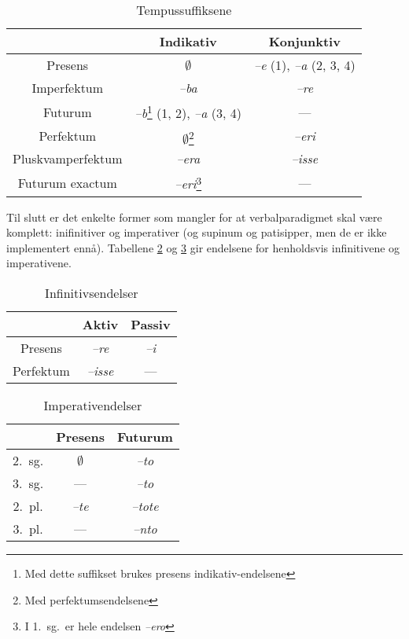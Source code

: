 \documentclass[a4paper]{article}
\begin{document}
\begin{table}[hp]
\begin{minipage}{\textwidth}
\begin{center}
\begin{tabular}{|c|c|c|}
    \hline
                  & Indikativ   & Konjunktiv \\
    \hline
Presens           & $\emptyset$ & \emph{--e} (1), \emph{--a} (2, 3, 4) \\
Imperfektum       & \emph{--ba} & \emph{--re} \\
Futurum           & \emph{--b}\footnote{Med dette suffikset brukes presens
indikativ-endelsene} (1, 2), \emph{--a} (3, 4) & --- \\
    \hline
Perfektum         & $\emptyset$\footnote{Med perfektumsendelsene} & \emph{--eri} \\
Pluskvamperfektum & \emph{--era} & \emph{--isse} \\
Futurum exactum   & \emph{--eri}\footnote{I 1.~sg.~er hele endelsen
\emph{--ero}} & ---        \\
    \hline
\end{tabular}
\end{center}
\end{minipage}
\caption{Tempussuffiksene}
\label{tempus}
\end{table}

Til slutt er det enkelte former som mangler for at verbalparadigmet skal
v\ae{}re komplett: inifinitiver og imperativer (og supinum og patisipper, men
de er ikke implementert enn\aa{}). Tabellene \ref{infinitiv} og
\ref{imperativ} gir endelsene for henholdsvis infinitivene og imperativene.

\begin{table}[hp]
\begin{center}
\begin{tabular}{|c|c|c|}
    \hline
          & Aktiv        & Passiv \\
    \hline
Presens   & \emph{--re}  & \emph{--i} \\
Perfektum & \emph{--isse} & --- \\
    \hline
\end{tabular}
\caption{Infinitivsendelser}
\label{infinitiv}
\end{center}
\end{table}

\begin{table}[hp]
\begin{center}
\begin{tabular}{|c|c|c|}
    \hline
       & Presens & Futurum \\
    \hline
2.~sg. & $\emptyset$ & \emph{--to} \\
3.~sg. & ---        & \emph{--to} \\
2.~pl. & \emph{--te} & \emph{--tote} \\
3.~pl. & ---         & \emph{--nto} \\
    \hline
\end{tabular}
\caption{Imperativendelser}
\label{imperativ}
\end{center}
\end{table}
\end{document}
